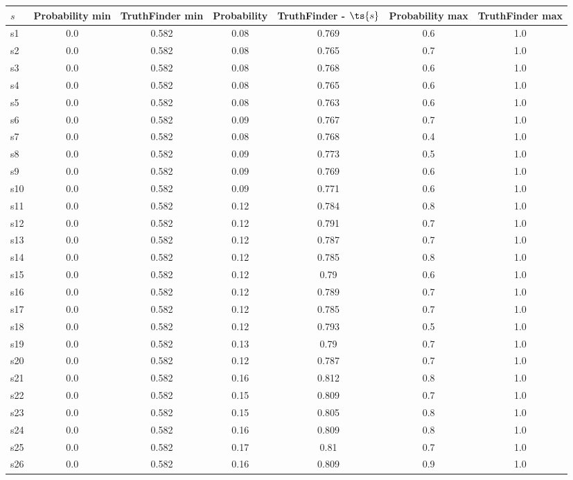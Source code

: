 \documentclass{article}
\begin{document}
\noindent\begin{tabular}{|l|c|c|c|c|c|c|}
\hline
$s$& Probability min & TruthFinder min & Probability & TruthFinder - $\ts{s}$ & Probability max & TruthFinder max\\
\hline
s1 &0.0 & 0.582 & 0.08 & 0.769 & 0.6 & 1.0\\
\hline
s2 &0.0 & 0.582 & 0.08 & 0.765 & 0.7 & 1.0\\
\hline
s3 &0.0 & 0.582 & 0.08 & 0.768 & 0.6 & 1.0\\
\hline
s4 &0.0 & 0.582 & 0.08 & 0.765 & 0.6 & 1.0\\
\hline
s5 &0.0 & 0.582 & 0.08 & 0.763 & 0.6 & 1.0\\
\hline
s6 &0.0 & 0.582 & 0.09 & 0.767 & 0.7 & 1.0\\
\hline
s7 &0.0 & 0.582 & 0.08 & 0.768 & 0.4 & 1.0\\
\hline
s8 &0.0 & 0.582 & 0.09 & 0.773 & 0.5 & 1.0\\
\hline
s9 &0.0 & 0.582 & 0.09 & 0.769 & 0.6 & 1.0\\
\hline
s10 &0.0 & 0.582 & 0.09 & 0.771 & 0.6 & 1.0\\
\hline
s11 &0.0 & 0.582 & 0.12 & 0.784 & 0.8 & 1.0\\
\hline
s12 &0.0 & 0.582 & 0.12 & 0.791 & 0.7 & 1.0\\
\hline
s13 &0.0 & 0.582 & 0.12 & 0.787 & 0.7 & 1.0\\
\hline
s14 &0.0 & 0.582 & 0.12 & 0.785 & 0.8 & 1.0\\
\hline
s15 &0.0 & 0.582 & 0.12 & 0.79 & 0.6 & 1.0\\
\hline
s16 &0.0 & 0.582 & 0.12 & 0.789 & 0.7 & 1.0\\
\hline
s17 &0.0 & 0.582 & 0.12 & 0.785 & 0.7 & 1.0\\
\hline
s18 &0.0 & 0.582 & 0.12 & 0.793 & 0.5 & 1.0\\
\hline
s19 &0.0 & 0.582 & 0.13 & 0.79 & 0.7 & 1.0\\
\hline
s20 &0.0 & 0.582 & 0.12 & 0.787 & 0.7 & 1.0\\
\hline
s21 &0.0 & 0.582 & 0.16 & 0.812 & 0.8 & 1.0\\
\hline
s22 &0.0 & 0.582 & 0.15 & 0.809 & 0.7 & 1.0\\
\hline
s23 &0.0 & 0.582 & 0.15 & 0.805 & 0.8 & 1.0\\
\hline
s24 &0.0 & 0.582 & 0.16 & 0.809 & 0.8 & 1.0\\
\hline
s25 &0.0 & 0.582 & 0.17 & 0.81 & 0.7 & 1.0\\
\hline
s26 &0.0 & 0.582 & 0.16 & 0.809 & 0.9 & 1.0\\

\end{tabular}
\end{document}
